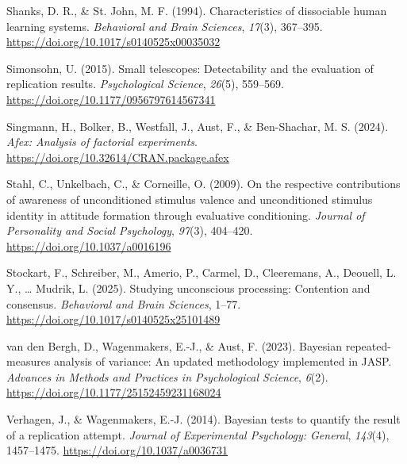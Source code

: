 \documentclass[
  man,floatsintext]{apa6}
\newlength{\cslhangindent}
\newlength{\cslentryspacingunit} %
\newenvironment{CSLReferences}[2] %
 {%
  \setlength{\parindent}{0pt}
  \ifodd #1
  \let\oldpar\par
  \def\par{\hangindent=\cslhangindent\oldpar}
  \fi
  \setlength{\parskip}{#2\cslentryspacingunit}
 }%
 {}
\begin{document}
\begin{CSLReferences}{1}{0}
\leavevmode{}%
Shanks, D. R., \& St. John, M. F. (1994). Characteristics of dissociable human learning systems. \emph{Behavioral and Brain Sciences}, \emph{17}(3), 367--395. \url{https://doi.org/10.1017/s0140525x00035032}

\leavevmode{}%
Simonsohn, U. (2015). Small telescopes: Detectability and the evaluation of replication results. \emph{Psychological Science}, \emph{26}(5), 559--569. \url{https://doi.org/10.1177/0956797614567341}

\leavevmode{}%
Singmann, H., Bolker, B., Westfall, J., Aust, F., \& Ben-Shachar, M. S. (2024). \emph{Afex: Analysis of factorial experiments}. \url{https://doi.org/10.32614/CRAN.package.afex}

\leavevmode{}%
Stahl, C., Unkelbach, C., \& Corneille, O. (2009). On the respective contributions of awareness of unconditioned stimulus valence and unconditioned stimulus identity in attitude formation through evaluative conditioning. \emph{Journal of Personality and Social Psychology}, \emph{97}(3), 404--420. \url{https://doi.org/10.1037/a0016196}

\leavevmode{}%
Stockart, F., Schreiber, M., Amerio, P., Carmel, D., Cleeremans, A., Deouell, L. Y., \ldots{} Mudrik, L. (2025). Studying unconscious processing: Contention and consensus. \emph{Behavioral and Brain Sciences}, 1--77. \url{https://doi.org/10.1017/s0140525x25101489}

\leavevmode{}%
van den Bergh, D., Wagenmakers, E.-J., \& Aust, F. (2023). Bayesian repeated-measures analysis of variance: An updated methodology implemented in JASP. \emph{Advances in Methods and Practices in Psychological Science}, \emph{6}(2). \url{https://doi.org/10.1177/25152459231168024}

\leavevmode{}%
Verhagen, J., \& Wagenmakers, E.-J. (2014). Bayesian tests to quantify the result of a replication attempt. \emph{Journal of Experimental Psychology: General}, \emph{143}(4), 1457--1475. \url{https://doi.org/10.1037/a0036731}

\end{CSLReferences}

\endgroup
\end{document}
